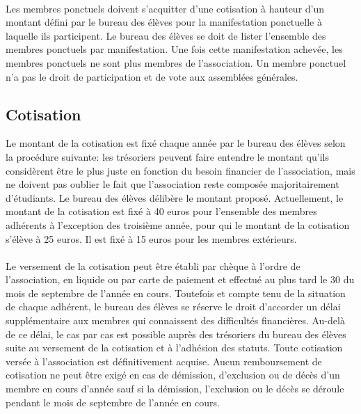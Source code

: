 \documentclass{article} %
\begin{document}
            \paragraph{}
			Les membres ponctuels doivent s’acquitter d’une cotisation à hauteur
			d’un montant défini par le bureau des élèves pour la manifestation
			ponctuelle à laquelle ils participent. Le bureau des élèves se doit
			de lister l’ensemble des membres ponctuels par manifestation. Une
			fois cette manifestation achevée, les membres ponctuels ne sont plus
			membres de l’association. Un membre ponctuel n’a pas le droit de
			participation et de vote aux assemblées générales.

		\subsection{Cotisation}
\label{sub:cotisation}

			Le montant de la cotisation est fixé chaque année par le bureau des
			élèves selon la procédure suivante: les trésoriers peuvent faire
			entendre le montant qu’ils considèrent être le plus juste en
			fonction du besoin financier de l’association, mais ne doivent pas
			oublier le fait que l’association reste composée majoritairement
			d'étudiants. Le bureau des élèves délibère le montant proposé.
			Actuellement, le montant de la cotisation est fixé à 40 euros pour
			l’ensemble des membres adhérents à l’exception des troisième année,
			pour qui le montant de la cotisation s’élève à 25 euros. Il est fixé
			à 15 euros pour les membres extérieurs.

            \paragraph{}
			Le versement de la cotisation peut être établi par chèque à l’ordre
			de l’association, en liquide ou par carte de paiement et effectué
			au plus tard le 30 du mois de septembre de l’année en cours.
			Toutefois et compte tenu de la situation de chaque adhérent, le
			bureau des élèves se réserve le droit d’accorder un délai
			supplémentaire aux membres qui connaissent des difficultés
			financières. Au-delà de ce délai, le cas par cas est possible auprès
			des trésoriers du bureau des élèves suite au versement de la
			cotisation et à l’adhésion des statuts. Toute cotisation versée à
			l’association est définitivement acquise. Aucun remboursement de
			cotisation ne peut être exigé en cas de démission, d’exclusion ou de
			décès d’un membre en cours d’année sauf si la démission, l’exclusion
			ou le décès se déroule pendant le mois de septembre de l’année en
			cours.
\end{document}

